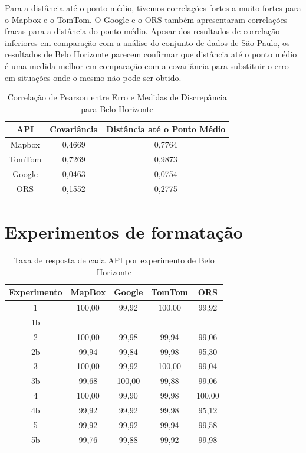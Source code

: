 Para a distância até o ponto médio, tivemos correlações fortes a muito fortes para o Mapbox e o TomTom. O Google e o ORS também apresentaram correlações fracas para a distância do ponto médio. Apesar dos resultados de correlação inferiores em comparação com a análise do conjunto de dados de São Paulo, os resultados de Belo Horizonte parecem confirmar que distância até o ponto médio é uma medida melhor em comparação com a covariância para substituir o erro em situações onde o mesmo não pode ser obtido.

\begin{table}[!ht]
\centering
\caption{Correlação de Pearson entre Erro e Medidas de Discrepância para Belo Horizonte}
\label{tab:correlationBH}
\begin{adjustbox}{width=0.7\textwidth}
\begin{tabular}{|c|c|c|}
\hline
API & Covariância & Distância até o Ponto Médio \\
\hline
Mapbox & 0,4669 & 0,7764 \\
TomTom & 0,7269 & 0,9873 \\
Google & 0,0463 & 0,0754 \\
ORS & 0,1552 & 0,2775 \\
\hline
\end{tabular}
\end{adjustbox}
\end{table}


\section{Experimentos de formatação}

\begin{table}[!ht]
\centering
\caption{Taxa de resposta de cada API por experimento de Belo Horizonte}
\label{tab:txRespExpAPIBH}
\begin{adjustbox}{width=0.7\textwidth}
\begin{tabular}{|c|c|c|c|c|}
\hline
Experimento & MapBox & Google & TomTom & ORS\\
\hline
1 & 100,00 & 99,92 & 100,00 & 99,92\\
\hline
1b &  &  &  & \\
\hline
2 & 100,00 & 99,98 & 99,94 & 99,06\\
\hline
2b & 99,94 & 99,84 & 99,98 & 95,30\\
\hline
3 & 100,00 & 99,92 & 100,00 & 99,04\\
\hline
3b & 99,68 & 100,00 & 99,88 & 99,06\\
\hline
4 & 100,00 & 99,90 & 99,98 & 100,00\\
\hline
4b & 99,92 & 99,92 & 99,98 & 95,12\\
\hline
5 & 99,92 & 99,92 & 99,94 & 99,58\\
\hline
5b & 99,76 & 99,88 & 99,92 & 99,98\\
\hline
\end{tabular}
\end{adjustbox}
\end{table}


